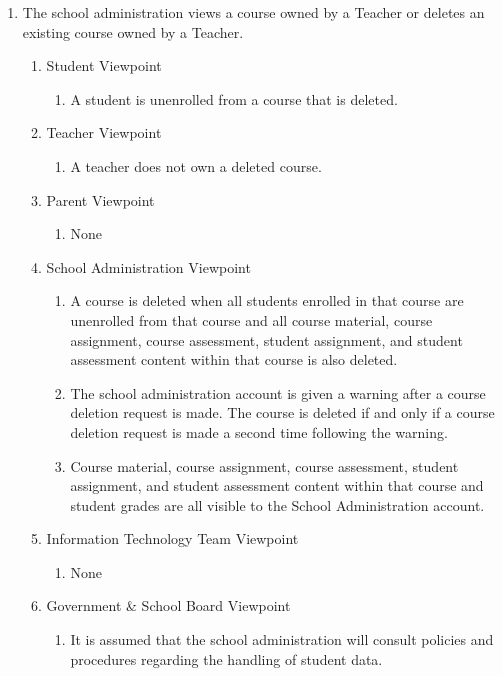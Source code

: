 \documentclass[]{article}
\begin{document}
\begin{enumerate}[{BE}1.]
	\item The school administration views a course owned by a Teacher or deletes an
existing course owned by a Teacher.
	\begin{enumerate}[{VP1}.1]
		\item Student Viewpoint
			\begin{enumerate}
				\item A student is unenrolled from a course that is deleted.
			\end{enumerate}
		\item Teacher Viewpoint
			\begin{enumerate}
				\item A teacher does not own a deleted course.
			\end{enumerate}
		\item Parent Viewpoint
			\begin{enumerate}
				\item None
			\end{enumerate}
		\item School Administration Viewpoint
			\begin{enumerate}
				\item A course is deleted when all students enrolled in that course are
unenrolled from that course and all course material, course assignment, course
assessment, student assignment, and student assessment content within that
course is also deleted.
				\item The school administration account is given a warning after a course
deletion request is made. The course is deleted if and only if a course deletion
request is made a second time following the warning.
				\item Course material, course assignment, course assessment, student
assignment, and student assessment content within that course and student grades
are all visible to the School Administration account.
			\end{enumerate}
		\item Information Technology Team Viewpoint
			\begin{enumerate}
				\item None
			\end{enumerate}
		\item Government \& School Board Viewpoint
			\begin{enumerate}
				\item It is assumed that the school administration will consult policies and
procedures regarding the handling of student data.
			\end{enumerate}
	\end{enumerate}


\end{enumerate}
\end{document}
